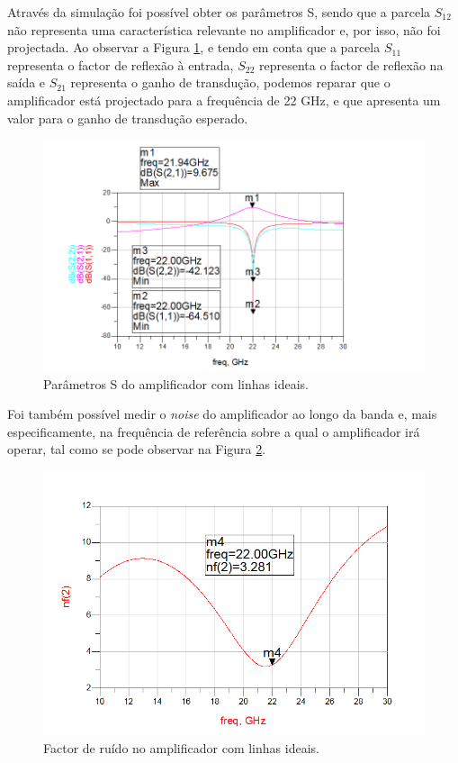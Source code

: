 \documentclass[11pt]{article}
\numberwithin{equation}{section}
\begin{document}
Através da simulação foi possível obter os parâmetros S, sendo que a parcela $S_{12}$ não representa uma característica relevante no amplificador e, por isso, não foi projectada. Ao observar a Figura \ref{fig:ideal_S}, e tendo em conta que a parcela $S_{11}$ representa o factor de reflexão à entrada, $S_{22}$ representa o factor de reflexão na saída e $S_{21}$ representa o ganho de transdução, podemos reparar que o amplificador está projectado para a frequência de 22 GHz, e que apresenta um valor para o ganho de transdução esperado.

\begin{figure}[H]
	\centering
	\includegraphics[keepaspectratio=true, scale=0.45]{exps/Ideal_S}
	\vspace{-0.5em}
	\caption{Parâmetros S do amplificador com linhas ideais.}
	\vspace{-0.8em}
	\label{fig:ideal_S}
\end{figure}

Foi também possível medir o \textit{noise} do amplificador ao longo da banda e, mais especificamente, na frequência de referência sobre a qual o amplificador irá operar, tal como se pode observar na Figura \ref{fig:ideal_noise}.

\begin{figure}[H]
	\centering
	\includegraphics[keepaspectratio=true, scale=0.45]{exps/Ideal_noise}
	\vspace{-0.5em}
	\caption{Factor de ruído no amplificador com linhas ideais.}
	\vspace{-0.8em}
	\label{fig:ideal_noise}
\end{figure}
\end{document}
